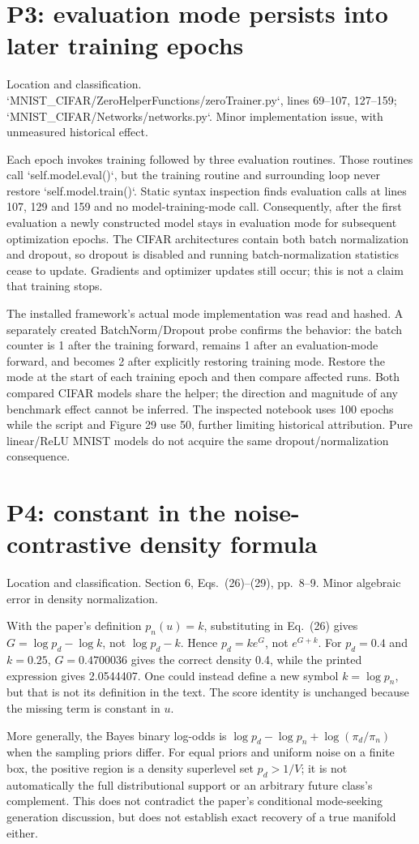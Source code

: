 \documentclass[10pt]{article}
\begin{document}
\section*{P3: evaluation mode persists into later training epochs}
Location and classification. `MNIST\_CIFAR/ZeroHelperFunctions/zeroTrainer.py`, lines 69–107, 127–159; `MNIST\_CIFAR/Networks/networks.py`. Minor implementation issue, with unmeasured historical effect.\par
Each epoch invokes training followed by three evaluation routines. Those routines call `self.model.eval()`, but the training routine and surrounding loop never restore `self.model.train()`. Static syntax inspection finds evaluation calls at lines 107, 129 and 159 and no model-training-mode call. Consequently, after the first evaluation a newly constructed model stays in evaluation mode for subsequent optimization epochs. The CIFAR architectures contain both batch normalization and dropout, so dropout is disabled and running batch-normalization statistics cease to update. Gradients and optimizer updates still occur; this is not a claim that training stops.\par
The installed framework’s actual mode implementation was read and hashed. A separately created BatchNorm/Dropout probe confirms the behavior: the batch counter is 1 after the training forward, remains 1 after an evaluation-mode forward, and becomes 2 after explicitly restoring training mode. Restore the mode at the start of each training epoch and then compare affected runs. Both compared CIFAR models share the helper; the direction and magnitude of any benchmark effect cannot be inferred. The inspected notebook uses 100 epochs while the script and Figure 29 use 50, further limiting historical attribution. Pure linear/ReLU MNIST models do not acquire the same dropout/normalization consequence.\par
\section*{P4: constant in the noise-contrastive density formula}
Location and classification. Section 6, Eqs. (26)–(29), pp. 8–9. Minor algebraic error in density normalization.\par
With the paper’s definition \(p_n(u)=k\), substituting in Eq. (26) gives \(G=\log p_d-\log k\), not \(\log p_d-k\). Hence \(p_d=k e^G\), not \(e^{G+k}\). For \(p_d=0.4\) and \(k=0.25\), \(G=0.4700036\) gives the correct density 0.4, while the printed expression gives 2.0544407. One could instead define a new symbol \(k=\log p_n\), but that is not its definition in the text. The score identity is unchanged because the missing term is constant in \(u\).\par
More generally, the Bayes binary log-odds is \(\log p_d-\log p_n+\log(\pi_d/\pi_n)\) when the sampling priors differ. For equal priors and uniform noise on a finite box, the positive region is a density superlevel set \(p_d>1/V\); it is not automatically the full distributional support or an arbitrary future class’s complement. This does not contradict the paper’s conditional mode-seeking generation discussion, but does not establish exact recovery of a true manifold either.\par
\end{document}
